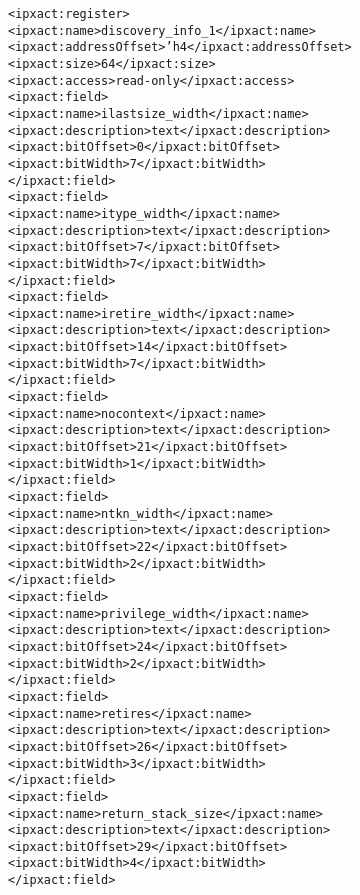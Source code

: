 \begin{alltt}
            <ipxact:register>
               <ipxact:name>discovery_info_1</ipxact:name>
               <ipxact:addressOffset>'h4</ipxact:addressOffset>
               <ipxact:size>64</ipxact:size>
               <ipxact:access>read-only</ipxact:access>
               <ipxact:field>
                  <ipxact:name>ilastsize_width</ipxact:name>
                  <ipxact:description>text</ipxact:description>
                  <ipxact:bitOffset>0</ipxact:bitOffset>
                  <ipxact:bitWidth>7</ipxact:bitWidth>
               </ipxact:field>
               <ipxact:field>
                  <ipxact:name>itype_width</ipxact:name>
                  <ipxact:description>text</ipxact:description>
                  <ipxact:bitOffset>7</ipxact:bitOffset>
                  <ipxact:bitWidth>7</ipxact:bitWidth>
               </ipxact:field>
               <ipxact:field>
                  <ipxact:name>iretire_width</ipxact:name>
                  <ipxact:description>text</ipxact:description>
                  <ipxact:bitOffset>14</ipxact:bitOffset>
                  <ipxact:bitWidth>7</ipxact:bitWidth>
               </ipxact:field>
               <ipxact:field>
                  <ipxact:name>nocontext</ipxact:name>
                  <ipxact:description>text</ipxact:description>
                  <ipxact:bitOffset>21</ipxact:bitOffset>
                  <ipxact:bitWidth>1</ipxact:bitWidth>
               </ipxact:field>
               <ipxact:field>
                  <ipxact:name>ntkn_width</ipxact:name>
                  <ipxact:description>text</ipxact:description>
                  <ipxact:bitOffset>22</ipxact:bitOffset>
                  <ipxact:bitWidth>2</ipxact:bitWidth>
               </ipxact:field>
               <ipxact:field>
                  <ipxact:name>privilege_width</ipxact:name>
                  <ipxact:description>text</ipxact:description>
                  <ipxact:bitOffset>24</ipxact:bitOffset>
                  <ipxact:bitWidth>2</ipxact:bitWidth>
               </ipxact:field>
               <ipxact:field>
                  <ipxact:name>retires</ipxact:name>
                  <ipxact:description>text</ipxact:description>
                  <ipxact:bitOffset>26</ipxact:bitOffset>
                  <ipxact:bitWidth>3</ipxact:bitWidth>
               </ipxact:field>
               <ipxact:field>
                  <ipxact:name>return_stack_size</ipxact:name>
                  <ipxact:description>text</ipxact:description>
                  <ipxact:bitOffset>29</ipxact:bitOffset>
                  <ipxact:bitWidth>4</ipxact:bitWidth>
               </ipxact:field>

\end{alltt}
